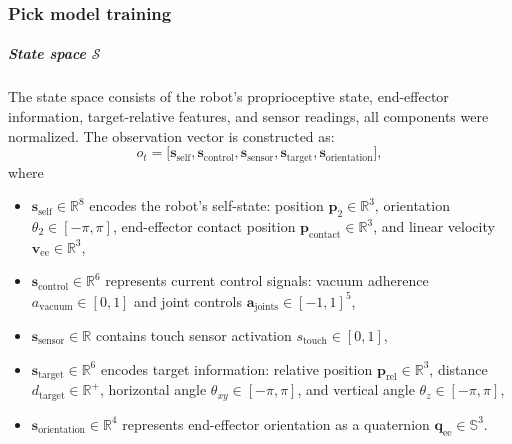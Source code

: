 \documentclass[english, 12pt, a4paper, elec, utf8, a-2b, online]{aaltothesis}
\begin{document}
\subsubsection{Pick model training}

\subparagraph{State space $\mathcal{S}$}
The state space consists of the robot's proprioceptive state, end-effector information, target-relative features, and sensor readings, all components were normalized. The observation vector is constructed as:
\begin{equation}
o_t = \big[ \mathbf{s}_{\text{self}}, \mathbf{s}_{\text{control}}, \mathbf{s}_{\text{sensor}}, \mathbf{s}_{\text{target}}, \mathbf{s}_{\text{orientation}} \big],
\end{equation}
where
\begin{itemize}
    \item $\mathbf{s}_{\text{self}} \in \mathbb{R}^8$ encodes the robot's self-state: position $\mathbf{p}_2 \in \mathbb{R}^3$, orientation $\theta_2 \in [-\pi,\pi]$, end-effector contact position $\mathbf{p}_{\text{contact}} \in \mathbb{R}^3$, and linear velocity $\mathbf{v}_{\text{ee}} \in \mathbb{R}^3$,
    \item $\mathbf{s}_{\text{control}} \in \mathbb{R}^6$ represents current control signals: vacuum adherence $a_{\text{vacuum}} \in [0,1]$ and joint controls $\mathbf{a}_{\text{joints}} \in [-1,1]^5$,
    \item $\mathbf{s}_{\text{sensor}} \in \mathbb{R}$ contains touch sensor activation $s_{\text{touch}} \in [0,1]$,
    \item $\mathbf{s}_{\text{target}} \in \mathbb{R}^6$ encodes target information: relative position $\mathbf{p}_{\text{rel}} \in \mathbb{R}^3$, distance $d_{\text{target}} \in \mathbb{R}^+$, horizontal angle $\theta_{xy} \in [-\pi,\pi]$, and vertical angle $\theta_z \in [-\pi,\pi]$,
    \item $\mathbf{s}_{\text{orientation}} \in \mathbb{R}^4$ represents end-effector orientation as a quaternion $\mathbf{q}_{\text{ee}} \in \mathbb{S}^3$.
\end{itemize}
\end{document}
